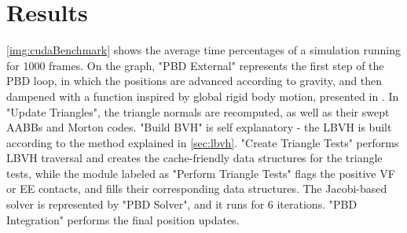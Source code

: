 \FloatBarrier
\chapter{Results}
\label{chapter:results}


\autoref{img:cudaBenchmark} shows the average time percentages of a simulation running for 1000 frames. On the graph, "PBD External" represents the first step of the PBD loop, in which the positions are advanced according to gravity, and then dampened with a function inspired by global rigid body motion, presented in \citep{mullerpbd}. In "Update Triangles", the triangle normals are recomputed, as well as their swept AABBs and Morton codes. "Build BVH" is self explanatory - the LBVH is built according to the method explained in \autoref{sec:lbvh}. "Create Triangle Tests" performs LBVH traversal and creates the cache-friendly data structures for the triangle tests, while the module labeled as "Perform Triangle Tests" flags the positive VF or EE contacts, and fills their corresponding data structures. The Jacobi-based solver is represented by "PBD Solver", and it runs for 6 iterations. "PBD Integration" performs the final position updates.

